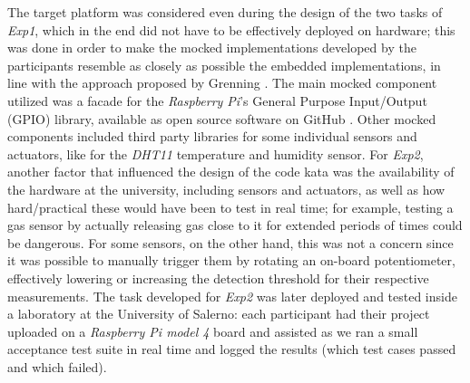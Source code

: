 The target platform was considered even during the design of the two tasks of \textit{Exp1}, which in the end did not have to be effectively deployed on hardware; this was done in order to make the mocked implementations developed by the participants resemble as closely as possible the embedded implementations, in line with the approach proposed by Grenning \cite{TDDEC}. The main mocked component utilized was a facade for the \textit{Raspberry Pi}'s General Purpose Input/Output (GPIO) library, available as open source software on GitHub \cite{GPIOMock}. Other mocked components included third party libraries for some individual sensors and actuators, like for the \textit{DHT11} temperature and humidity sensor.
For \textit{Exp2}, another factor that influenced the design of the code kata was the availability of the hardware at the university, including sensors and actuators, as well as how hard/practical these would have been to test in real time; for example, testing a gas sensor by actually releasing gas close to it for extended periods of times could be dangerous. For some sensors, on the other hand, this was not a concern since it was possible to manually trigger them by rotating an on-board potentiometer, effectively lowering or increasing the detection threshold for their respective measurements.
The task developed for \textit{Exp2} was later deployed and tested inside a laboratory at the University of Salerno: each participant had their project uploaded on a \textit{Raspberry Pi model 4} board and assisted as we ran a small acceptance test suite in real time and logged the results (\ie which test cases passed and which failed). 

